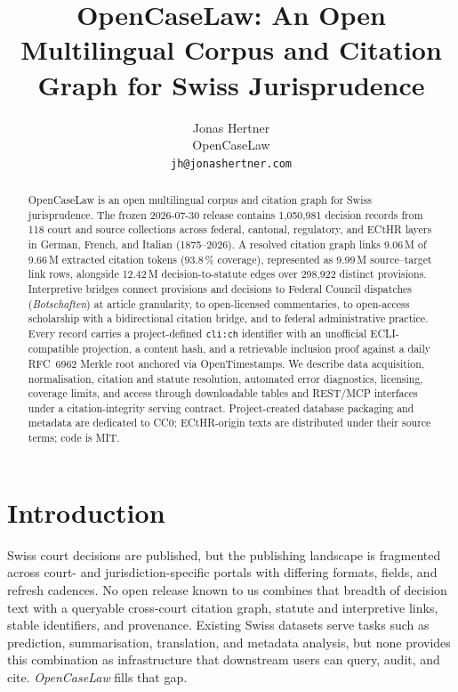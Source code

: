 \documentclass[11pt,a4paper]{article}
\title{OpenCaseLaw: An Open Multilingual Corpus and Citation Graph for Swiss Jurisprudence}
\author{%
  Jonas Hertner \\
  OpenCaseLaw \\
  \texttt{jh@jonashertner.com}
}
\newcommand{\SnapDate}{2026-07-30}
\newcommand{\NRecords}{1{,}050{,}981}
\newcommand{\NExtracted}{9.66\,M}
\newcommand{\NResolved}{9.06\,M}
\newcommand{\NCoverage}{93.8\,\%}
\newcommand{\NLinks}{9.99\,M}
\newcommand{\NStatuteEdges}{12.42\,M}
\newcommand{\NProvisions}{298{,}922}
\begin{document}
\maketitle

\begin{abstract}
OpenCaseLaw is an open multilingual corpus and citation graph for Swiss jurisprudence. The frozen \SnapDate{} release contains \NRecords{} decision records from 118 court and source collections across federal, cantonal, regulatory, and ECtHR layers in German, French, and Italian (1875--2026). A resolved citation graph links \NResolved{} of \NExtracted{} extracted citation tokens (\NCoverage{} coverage), represented as \NLinks{} source--target link rows, alongside \NStatuteEdges{} decision-to-statute edges over \NProvisions{} distinct provisions. Interpretive bridges connect provisions and decisions to Federal Council dispatches (\emph{Botschaften}) at article granularity, to open-licensed commentaries, to open-access scholarship with a bidirectional citation bridge, and to federal administrative practice. Every record carries a project-defined \texttt{cli:ch} identifier with an unofficial ECLI-compatible projection, a content hash, and a retrievable inclusion proof against a daily RFC~6962 Merkle root anchored via OpenTimestamps. We describe data acquisition, normalisation, citation and statute resolution, automated error diagnostics, licensing, coverage limits, and access through downloadable tables and REST/MCP interfaces under a citation-integrity serving contract. Project-created database packaging and metadata are dedicated to CC0; ECtHR-origin texts are distributed under their source terms; code is MIT.
\end{abstract}

\section{Introduction}\label{sec:intro}

Swiss court decisions are published, but the publishing landscape is fragmented across court- and jurisdiction-specific portals with differing formats, fields, and refresh cadences. No open release known to us combines that breadth of decision text with a queryable cross-court citation graph, statute and interpretive links, stable identifiers, and provenance. Existing Swiss datasets serve tasks such as prediction, summarisation, translation, and metadata analysis, but none provides this combination as infrastructure that downstream users can query, audit, and cite. \emph{OpenCaseLaw} fills that gap.
\end{document}
